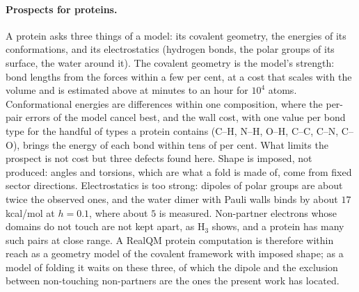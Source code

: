 \documentclass[11pt]{article}
\begin{document}
\paragraph{Prospects for proteins.} A protein asks three things of a model: its covalent geometry, the
energies of its conformations, and its electrostatics (hydrogen bonds, the polar groups of its surface, the
water around it). The covalent geometry is the model's strength: bond lengths from the forces within a few per
cent, at a cost that scales with the volume and is estimated above at minutes to an hour for $10^4$ atoms.
Conformational energies are differences within one composition, where the per-pair errors of the model cancel
best, and the wall cost, with one value per bond type for the handful of types a protein contains (C--H,
N--H, O--H, C--C, C--N, C--O), brings the energy of each bond within tens of per cent. What limits the
prospect is not cost but three defects found here. Shape is imposed, not produced: angles and torsions, which
are what a fold is made of, come from fixed sector directions. Electrostatics is too strong: dipoles of polar
groups are about twice the observed ones, and the water dimer with Pauli walls binds by about $17$\,kcal/mol at
$h = 0.1$, where about $5$ is measured. Non-partner electrons whose domains do not touch are not kept apart, as
H$_3$ shows, and a protein has many such pairs at close range. A RealQM protein computation is therefore within
reach as a geometry model of the covalent framework with imposed shape; as a model of folding it waits on these
three, of which the dipole and the exclusion between non-touching non-partners are the ones the present
work has located.
\end{document}
